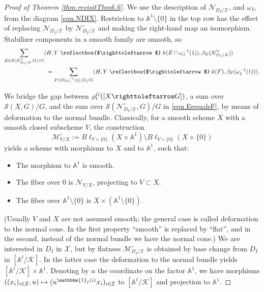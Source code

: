 \documentclass[12pt,reqno]{amsart}
\theoremstyle{plain}
\theoremstyle{remark}
\theoremstyle{definition}
\numberwithin{equation}{section}
\newcommand{\A}{{\mathbb A}}
\newcommand{\cI}{{\mathcal I}}
\newcommand{\cK}{{\mathcal K}}
\newcommand{\cM}{{\mathcal M}}
\newcommand{\cS}{{\mathcal S}}
\newcommand{\cX}{{\mathcal X}}
\newcommand{\actsfromleft}{\mathrel{\reflectbox{$\righttoleftarrow$}}}
\newcommand{\actsfromright}{\righttoleftarrow}
\begin{document}
\begin{proof}[Proof of Theorem \ref{thm.revisitThm6.6}]
We use the description of $\mathcal{N}_{D_I/\cX}$, and $\omega_I$, from the diagram \eqref{eqn.NDIX}.
Restriction to $\A^1\setminus \{0\}$ in the top row has the effect of replacing
$\mathcal{N}_{D_I/\cX}$ by $\mathcal{N}_{D_I/\cX}^\circ$ and making the right-hand map an isomorphism.
Stabilizer components in a smooth family are smooth, so
\begin{align}
\begin{split}
\label{eqn.EequalsF}
\sum_{E\in \cS(\mathcal{N}^\circ_{D_I/\cX},G)/G}(&H,Y\actsfromleft k(E\cap \omega_I^{-1}(1)),\beta_E(\mathcal{N}^\circ_{D_I/\cX})) \\
&=\sum_{F\in \cS(\omega_I^{-1}(1),G)/G}(H,Y\actsfromleft k(F),\beta_F(\omega_I^{-1}(1))).
\end{split}
\end{align}

We bridge the gap between $\rho_t^G([X\actsfromright G])$, a sum over
$\cS(X,G)/G$, and the sum over
$\cS(\mathcal{N}^\circ_{D_I/\cX},G)/G$ in \eqref{eqn.EequalsF}, by means of deformation to the normal bundle.
Classically, for a smooth scheme $X$ with a smooth closed subscheme $V$, the construction
\[ \cM_{V/X}^\circ:=B\ell_{V\times\{0\}}(X\times \A^1)\setminus B\ell_{V\times\{0\}}(X\times \{0\}) \]
yields a scheme with morphisms to $X$ and to $\A^1$, such that:
\begin{itemize}
\item The morphism to $\A^1$ is smooth.
\item The fiber over $0$ is $\mathcal{N}_{V/X}$, projecting to $V\subset X$.
\item The fiber over $\A^1\setminus \{0\}$ is $X\times (\A^1\setminus \{0\})$.
\end{itemize}
(Usually $V$ and $X$ are not assumed smooth;
the general case is called deformation to the normal cone.
In the first property ``smooth'' is replaced by ``flat'', and in the second, instead of the normal bundle we have the normal cone.)
We are interested in $D_I$ in $\cX$, but by flatness $\cM_{D_I/\cX}^\circ$ is obtained by base change from $D_I$ in $[\A^\ell/\cK]$.
In the latter case the deformation to the normal bundle yields $[\A^\ell/\cK]\times \A^1$.
Denoting by $u$ the coordinate on the factor $\A^1$, we have morphisms $((x_i)_{i\in \cI},u)\mapsto (u^{\mathbbm{1}_I(i)}x_i)_{i\in \cI}$ to $[\A^\ell/\cK]$ and projection to $\A^1$.


\end{proof}
\end{document}
